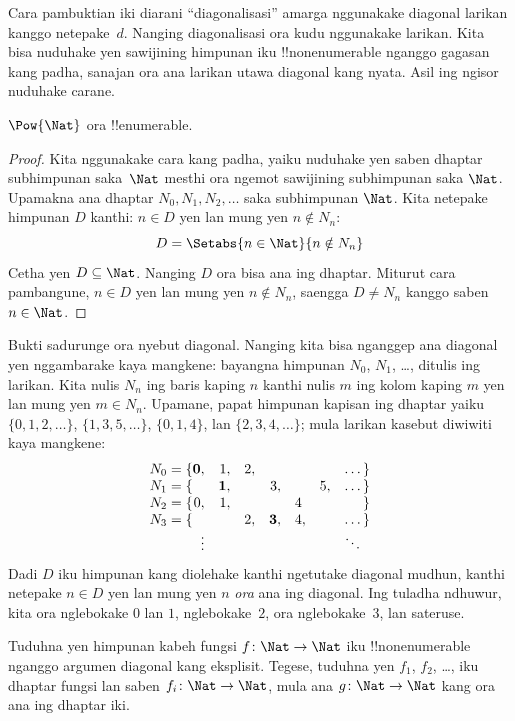 \documentclass[../../../include/open-logic-section]{subfiles}
\begin{document}
\begin{explain}
Cara pambuktian iki diarani ``diagonalisasi'' amarga nggunakake diagonal
larikan kanggo netepake~$d$. Nanging diagonalisasi ora kudu
nggunakake larikan. Kita bisa nuduhake yen sawijining himpunan
iku !!{nonenumerable} nganggo gagasan kang padha, sanajan ora ana larikan
utawa diagonal kang nyata. Asil ing ngisor nuduhake carane.
\end{explain}

\begin{thm}
$\Pow{\Nat}$ ora !!{enumerable}.
\end{thm}

\begin{proof}
Kita nggunakake cara kang padha, yaiku nuduhake yen saben dhaptar
subhimpunan saka~$\Nat$ mesthi ora ngemot sawijining subhimpunan saka $\Nat$.
Upamakna ana dhaptar $N_0, N_1, N_2, \ldots$ saka subhimpunan $\Nat$.
Kita netepake himpunan $D$ kanthi: $n \in D$ yen lan mung yen $n \notin N_{n}$:
\[
D = \Setabs{n \in \Nat}{n \notin N_n}
\]
Cetha yen $D\subseteq \Nat$. Nanging $D$ ora bisa ana ing dhaptar.
Miturut cara pambangune, $n \in D$ yen lan mung yen $n\notin N_n$,
saengga $D \neq N_n$ kanggo saben $n \in \Nat$.
\end{proof}

\begin{explain}
Bukti sadurunge ora nyebut diagonal. Nanging kita bisa nganggep
ana diagonal yen nggambarake kaya mangkene: bayangna himpunan
$N_0$, $N_1$, \dots, ditulis ing larikan. Kita nulis $N_n$ ing
baris kaping $n$ kanthi nulis $m$ ing kolom kaping $m$
yen lan mung yen $m \in N_n$. Upamane, papat himpunan kapisan
ing dhaptar yaiku $\{0,1,2,\dots\}$, $\{1, 3, 5, \dots\}$, $\{0,1,4\}$,
lan $\{2,3,4,\dots\}$; mula larikan kasebut diwiwiti kaya mangkene:
\[
\begin{array}{r@{}rrrrrrr}
  N_0 = \{ & \mathbf{0}, & 1, & 2, & & & & \dots\}\\
  N_1 = \{ &  & \mathbf{1}, &  & 3, &  & 5, & \dots\}\\
  N_2 = \{ & 0, & 1, &  &  & 4\phantom{,} &  & \}\\
  N_3 = \{ &  &  & 2, & \mathbf{3}, & 4, & & \dots\}\\
  &\vdots & & & & & & \ddots\phantom{\}}
  \end{array}
\]
Dadi $D$ iku himpunan kang diolehake kanthi ngetutake diagonal mudhun,
kanthi netepake $n \in D$ yen lan mung yen $n$ \emph{ora} ana ing diagonal.
Ing tuladha ndhuwur, kita ora nglebokake $0$ lan $1$, nglebokake~$2$,
ora nglebokake~$3$, lan sateruse.
\end{explain}

\begin{prob}
Tuduhna yen himpunan kabeh fungsi $f \colon \Nat \to \Nat$
iku !!{nonenumerable} nganggo argumen diagonal kang eksplisit. Tegese,
tuduhna yen $f_1$, $f_2$, \dots, iku dhaptar fungsi lan saben $f_i\colon
\Nat \to \Nat$, mula ana $g \colon \Nat \to
\Nat$ kang ora ana ing dhaptar iki.
\end{prob}
\end{document}
